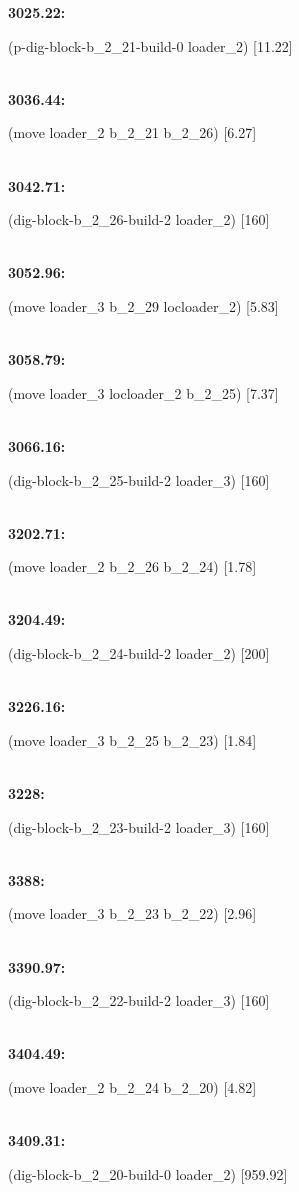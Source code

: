 \documentclass[a4paper,12pt]{article}
\newcommand{\atime}[1]{{\bf #1:}}
\newcommand{\action}[1]{{\sf #1}}
\newcommand{\listrow}[1]{\begin{minipage}[t]{11.5cm} #1 \end{minipage}}
\begin{document}
\begin{tabbing}
\atime{3025.22} \> \listrow{\action{(p-dig-block-b\_2\_21-build-0 loader\_2) [11.22]}}\\
\atime{3036.44} \> \listrow{\action{(move loader\_2 b\_2\_21 b\_2\_26) [6.27]}}\\
\atime{3042.71} \> \listrow{\action{(dig-block-b\_2\_26-build-2 loader\_2) [160]}}\\
\atime{3052.96} \> \listrow{\action{(move loader\_3 b\_2\_29 locloader\_2) [5.83]}}\\
\atime{3058.79} \> \listrow{\action{(move loader\_3 locloader\_2 b\_2\_25) [7.37]}}\\
\atime{3066.16} \> \listrow{\action{(dig-block-b\_2\_25-build-2 loader\_3) [160]}}\\
\atime{3202.71} \> \listrow{\action{(move loader\_2 b\_2\_26 b\_2\_24) [1.78]}}\\
\atime{3204.49} \> \listrow{\action{(dig-block-b\_2\_24-build-2 loader\_2) [200]}}\\
\atime{3226.16} \> \listrow{\action{(move loader\_3 b\_2\_25 b\_2\_23) [1.84]}}\\
\atime{3228} \> \listrow{\action{(dig-block-b\_2\_23-build-2 loader\_3) [160]}}\\
\atime{3388} \> \listrow{\action{(move loader\_3 b\_2\_23 b\_2\_22) [2.96]}}\\
\atime{3390.97} \> \listrow{\action{(dig-block-b\_2\_22-build-2 loader\_3) [160]}}\\
\atime{3404.49} \> \listrow{\action{(move loader\_2 b\_2\_24 b\_2\_20) [4.82]}}\\
\atime{3409.31} \> \listrow{\action{(dig-block-b\_2\_20-build-0 loader\_2) [959.92]}}\\
\end{tabbing}
\end{document}
